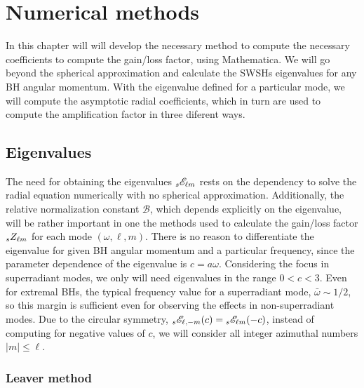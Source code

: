 
\chapter{Numerical methods} %
\label{Chapter4}

In this chapter will will develop the necessary method to compute the necessary coefficients to compute the gain/loss factor, using Mathematica\texttrademark.
We will go beyond the spherical approximation and calculate the SWSHs eigenvalues for any BH angular momentum.
With the eigenvalue defined for a particular mode, we will compute the asymptotic radial coefficients, which in turn are used to compute the amplification factor in three diferent ways.


\section{Eigenvalues}

The need for obtaining the eigenvalues $\uu[s]{\mathscr{E}}{\ell m}$ rests on the dependency to solve the radial equation numerically with no spherical approximation.
Additionally, the relative normalization constant $\mathscr{B}$, which depends explicitly on the eigenvalue, will be rather important in one the methods used to calculate the gain/loss factor $\uu[s]{Z}{\ell m}$ for each mode $(\omega,\ell,m)$.
There is no reason to differentiate the eigenvalue for given BH angular momentum and a particular frequency, since the parameter dependence of the eigenvalue is $c=a\omega$.
Considering the focus in superradiant modes, we only will need eigenvalues in the range $0<c<3$. 
Even for extremal BHs, the typical frequency value for a superradiant mode, $\bar{\omega}\sim 1/2$, so this margin is sufficient even for observing the effects in non-superradiant modes.
Due to the circular symmetry, $\uu[s]{\mathscr{E}}{\ell, -m}(c) = \uu[s]{\mathscr{E}}{\ell m}(-c)$, instead of computing for negative values of $c$, we will consider all integer azimuthal numbers $|m|\le \ell$.


\subsection{Leaver method}

